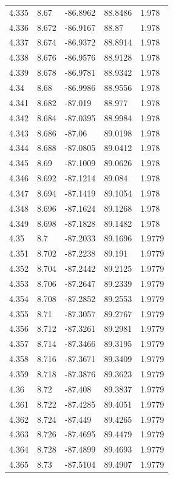 \begin{tabular}{lllll}
4.335 & 8.67 & -86.8962 & 88.8486 & 1.978 \\
4.336 & 8.672 & -86.9167 & 88.87 & 1.978 \\
4.337 & 8.674 & -86.9372 & 88.8914 & 1.978 \\
4.338 & 8.676 & -86.9576 & 88.9128 & 1.978 \\
4.339 & 8.678 & -86.9781 & 88.9342 & 1.978 \\
4.34 & 8.68 & -86.9986 & 88.9556 & 1.978 \\
4.341 & 8.682 & -87.019 & 88.977 & 1.978 \\
4.342 & 8.684 & -87.0395 & 88.9984 & 1.978 \\
4.343 & 8.686 & -87.06 & 89.0198 & 1.978 \\
4.344 & 8.688 & -87.0805 & 89.0412 & 1.978 \\
4.345 & 8.69 & -87.1009 & 89.0626 & 1.978 \\
4.346 & 8.692 & -87.1214 & 89.084 & 1.978 \\
4.347 & 8.694 & -87.1419 & 89.1054 & 1.978 \\
4.348 & 8.696 & -87.1624 & 89.1268 & 1.978 \\
4.349 & 8.698 & -87.1828 & 89.1482 & 1.978 \\
4.35 & 8.7 & -87.2033 & 89.1696 & 1.9779 \\
4.351 & 8.702 & -87.2238 & 89.191 & 1.9779 \\
4.352 & 8.704 & -87.2442 & 89.2125 & 1.9779 \\
4.353 & 8.706 & -87.2647 & 89.2339 & 1.9779 \\
4.354 & 8.708 & -87.2852 & 89.2553 & 1.9779 \\
4.355 & 8.71 & -87.3057 & 89.2767 & 1.9779 \\
4.356 & 8.712 & -87.3261 & 89.2981 & 1.9779 \\
4.357 & 8.714 & -87.3466 & 89.3195 & 1.9779 \\
4.358 & 8.716 & -87.3671 & 89.3409 & 1.9779 \\
4.359 & 8.718 & -87.3876 & 89.3623 & 1.9779 \\
4.36 & 8.72 & -87.408 & 89.3837 & 1.9779 \\
4.361 & 8.722 & -87.4285 & 89.4051 & 1.9779 \\
4.362 & 8.724 & -87.449 & 89.4265 & 1.9779 \\
4.363 & 8.726 & -87.4695 & 89.4479 & 1.9779 \\
4.364 & 8.728 & -87.4899 & 89.4693 & 1.9779 \\
4.365 & 8.73 & -87.5104 & 89.4907 & 1.9779 \\

\end{tabular}
